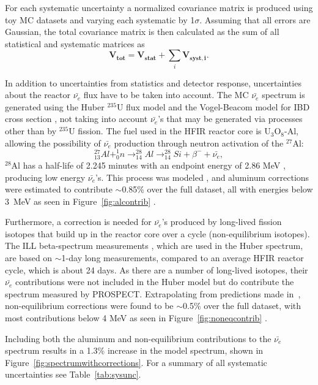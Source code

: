 For each systematic uncertainty a normalized covariance matrix is produced using toy MC datasets and varying each systematic by 1$\sigma$.
Assuming that all errors are Gaussian, the total covariance matrix is then calculated as the sum of all statistical and systematic matrices as
\begin{equation}
	\mathbf{V_{tot}} = \mathbf{V_{stat}} + \sum_{i}\mathbf{V_{syst,i}}.
\end{equation}

In addition to uncertainties from statistics and detector response, uncertainties about the reactor $\bar{\nu_{e}}$ flux have to be taken into account.
The MC $\bar{\nu_{e}}$ spectrum is generated using the Huber $^{235}$U flux model \cite{Huber} and the Vogel-Beacom model for IBD cross section \cite{Vogel:1999zy}, not taking into account $\bar{\nu_{e}}$'s that may be generated via processes other than by $^{235}$U fission.
The fuel used in the HFIR reactor core is U$_3$O$_8$-Al, allowing the possibility of $\bar{\nu_{e}}$ production through neutron activation of the $^{27}$Al:
\begin{equation}
	^{27}_{13}Al + ^1_0n \rightarrow ^{28}_{14}Al \rightarrow ^{28}_{14}Si + \beta^- + \bar{\nu_{e}},
\end{equation}
$^{28}$Al has a half-life of 2.245 minutes with an endpoint energy of 2.86 MeV \cite{ENSDF}, producing low energy $\bar{\nu_{e}}$'s.
This process was modeled \cite{ConantThesis}, and aluminum corrections were estimated to contribute $\sim$0.85\% over the full dataset, all with energies below 3~MeV as seen in Figure~\ref{fig:alcontrib} \cite{PSurukuchi:2338}. 

Furthermore, a correction is needed for $\bar{\nu_{e}}$'s produced by long-lived fission isotopes that build up in the reactor core over a cycle (non-equilibrium isotopes).
The ILL beta-spectrum measurements \cite{VonFeilitzsch:1982jw, Schreckenbach:1985ep, Hahn:1989zr}, which are used in the Huber spectrum, are based on $\sim$1-day long measurements, compared to an average HFIR reactor cycle, which is about 24 days.
As there are a number of long-lived isotopes, their $\bar{\nu_{e}}$ contributions were not included in the Huber model but do contribute the spectrum measured by PROSPECT.
Extrapolating from predictions made in~\cite{Mueller}, non-equilibrium corrections were found to be $\sim$0.5\% over the full dataset, with most contributions below 4 MeV as seen in Figure~\ref{fig:noneqcontrib} \cite{PSurukuchi:2346}.

Including both the aluminum and non-equilibrium contributions to the $\bar{\nu_{e}}$ spectrum results in a 1.3\% increase in the model spectrum, shown in Figure~\ref{fig:spectrumwithcorrections}.
For a summary of all systematic uncertainties see Table~\ref{tab:sysunc}.

